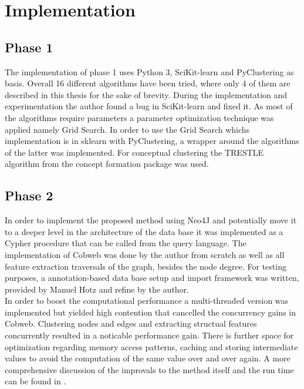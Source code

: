 \section{Implementation}
\subsection{Phase 1}
The implementation of phase 1 uses Python 3, SciKit-learn and PyClustering as basis. Overall 16 different algorithms have been tried, where only 4 of them are described in this thesis for the sake of brevity. During the implementation and experimentation the author found a bug in SciKit-learn and fixed it. As most of the algorithms require parameters a parameter optimization technique was applied namely Grid Search. In order to use the Grid Search whichs implementation is in sklearn with PyClustering, a wrapper around the algorithms of the latter was implemented. For conceptual clustering the TRESTLE algorithm from the concept formation package was used.


\subsection{Phase 2}
In order to implement the proposed method using Neo4J and potentially move it to a deeper level in the architecture of the data base it was implemented as a Cypher procedure that can be called from the query language. The implementation of Cobweb was done by the author from scratch as well as all feature extraction traversals of the graph, besides the node degree. For testing purposes, a annotation-based data base setup and import framework was written, provided by Manuel Hotz and refine by the author. \\
In order to boost the computational performance a multi-threaded version was implemented but yielded high contention that cancelled the concurrency gains in Cobweb. Clustering nodes and edges and extracting structual features concurrently resulted in a noticable performance gain. There is further space for optimization regarding memory access patterns, caching and storing intermediate values to avoid the computation of the same value over and over again. A more comprehensive discussion of the improvals to the method itself and the run time can be found in . \\
